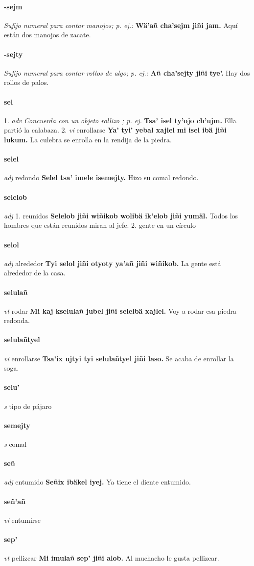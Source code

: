 \documentclass{scrbook}
\newcommand{\entry}[1]{\paragraph{#1}}
\newcommand{\onedefinition}[1]{#1.}
\newcommand{\nontranslationdef}[1]{\textit{#1}}
\newcommand{\partofspeech}[1]{\textit{#1}}
\newcommand{\spanishtranslation}[1]{#1}
\newcommand{\cholexample}[1]{\textbf{#1}}
\newcommand{\exampletranslation}[1]{#1}
\begin{document}
\begin{multicols}{2}
\entry{-sejm}
\nontranslationdef{Sufijo numeral para contar manojos; p. ej.:}
\cholexample{Wä'añ cha'sejm jiñi jam.}
\exampletranslation{Aquí están dos manojos de zacate.}

\entry{-sejty}
\nontranslationdef{Sufijo numeral para contar rollos de algo; p. ej.:}
\cholexample{Añ cha'sejty jiñi tye'.}
\exampletranslation{Hay dos rollos de palos.}

\entry{sel}
\onedefinition{1}
\partofspeech{adv}
\nontranslationdef{Concuerda con un objeto rollizo ; p. ej.}
\cholexample{Tsa' isel ty'ojo ch'ujm.}
\exampletranslation{Ella partió la calabaza.}
\onedefinition{2}
\partofspeech{vi}
\spanishtranslation{enrollarse}
\cholexample{Ya' tyi' yebal xajlel mi isel ibä jiñi lukum.}
\exampletranslation{La culebra se enrolla en la rendija de la piedra.}

\entry{selel}
\partofspeech{adj}
\spanishtranslation{redondo}
\cholexample{Selel tsa' imele isemejty.}
\exampletranslation{Hizo su comal redondo.}

\entry{selelob}
\partofspeech{adj}
\onedefinition{1}
\spanishtranslation{reunidos}
\cholexample{Selelob jiñi wiñikob wolibä ik'elob jiñi yumäl.}
\exampletranslation{Todos los hombres que están reunidos miran al jefe.}
\onedefinition{2}
\spanishtranslation{gente en un círculo}

\entry{selol}
\partofspeech{adj}
\spanishtranslation{alrededor}
\cholexample{Tyi selol jiñi otyoty ya'añ jiñi wiñikob.}
\exampletranslation{La gente está alrededor de la casa.}

\entry{selulañ}
\partofspeech{vt}
\spanishtranslation{rodar}
\cholexample{Mi kaj kselulañ jubel jiñi selelbä xajlel.}
\exampletranslation{Voy a rodar esa piedra redonda.}

\entry{selulañtyel}
\partofspeech{vi}
\spanishtranslation{enrollarse}
\cholexample{Tsa'ix ujtyi tyi selulañtyel jiñi laso.}
\exampletranslation{Se acaba de enrollar la soga.}

\entry{selu'}
\partofspeech{s}
\spanishtranslation{tipo de pájaro}

\entry{semejty}
\partofspeech{s}
\spanishtranslation{comal}

\entry{señ}
\partofspeech{adj}
\spanishtranslation{entumido}
\cholexample{Señix ibäkel iyej.}
\exampletranslation{Ya tiene el diente entumido.}

\entry{señ'añ}
\partofspeech{vi}
\spanishtranslation{entumirse}

\entry{sep'}
\partofspeech{vt}
\spanishtranslation{pellizcar}
\cholexample{Mi imulañ sep' jiñi alob.}
\exampletranslation{Al muchacho le gusta pellizcar.}


\end{multicols}
\end{document}
